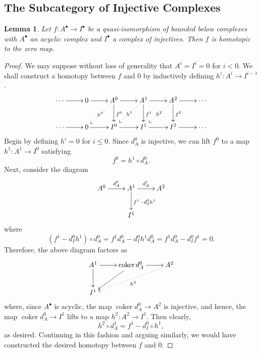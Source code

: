 \documentclass[11pt]{article}
\theoremstyle{thmstyle}
\newtheorem{lemma}[theorem]{Lemma}
\theoremstyle{defstyle}
\newcommand{\coker}{\operatorname{coker}}
\renewcommand{\le}{\leqslant}
\begin{document}
\subsection{The Subcategory of Injective Complexes}

\begin{lemma}
	Let $f\colon A^\bullet\to I^\bullet$ be a quasi-isomorphism of bounded below complexes with $A^\bullet$ an acyclic complex and $I^\bullet$ a complex of injectives. Then $f$ is homotopic to the zero map.
\end{lemma}
\begin{proof}
	We may suppose without loss of generality that $A^i = I^i = 0$ for $i < 0$. We shall construct a homotopy between $f$ and $0$ by inductively defining $h^i\colon A^i\to I^{i - 1}$.
	\begin{equation*}
		\xymatrix {
			\cdots\ar[r] & 0\ar[r] & A^0\ar[r]\ar[d]^{f^0}\ar@{.>}[ld]|-{h^0} & A^1\ar[r]\ar[d]^{f^1}\ar@{.>}[ld]|-{h^1} & A^2\ar[r]\ar[d]^{f^2}\ar@{.>}[ld]|-{h^2} & \cdots\\
			\cdots\ar[r] & 0\ar[r] & I^0\ar[r] & I^1\ar[r] & I^2\ar[r] & \cdots\\
		}
	\end{equation*}
	Begin by defining $h^i = 0$ for $i\le 0$. Since $d_A^0$ is injective, we can lift $f^0$ to a map $h^1\colon A^1\to I^0$ satisfying 
	\begin{equation*}
		f^0 = h^1\circ d_A^0.
	\end{equation*}
	Next, consider the diagram 
	\begin{equation*}
		\xymatrix {
			A^0\ar[r]^-{d^0_A} & A^1\ar[d]^{f^1 - d^0_Ih^1}\ar[r]^-{d^1_A} & A^2\\
			& I^1
		}
	\end{equation*}
	where 
	\begin{equation*}
		\left(f^1 - d^0_I h^1\right)\circ d^0_A = f^1 d^0_A - d^0_I h^1 d^0_A = f^1d^0_A - d^0_If^1 = 0.
	\end{equation*}
	Therefore, the above diagram factors as 
	\begin{equation*}
		\xymatrix {
			A^1\ar[r]\ar[d] & \coker d^0_A\ar[r]\ar[ld] & A^2\ar@{.>}[lld]^{h^2}\\
			I^1
		}
	\end{equation*}
	where, since $A^\bullet$ is acyclic, the map $\coker d^0_A\to A^2$ is injective, and hence, the map $\coker d^0_A\to I^1$ lifts to a map $h^2\colon A^2\to I^1$. Then clearly, 
	\begin{equation*}
		h^2\circ d^1_A = f^1 - d_I^0\circ h^1,
	\end{equation*}
	as desired. Continuing in this fashion and arguing similarly, we would have constructed the desired homotopy between $f$ and $0$.
\end{proof}
\end{document}
